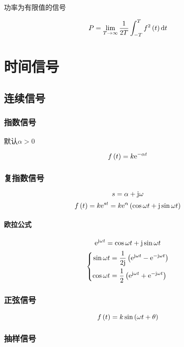 \documentclass{article}
\begin{document}
功率为有限值的信号

\[P=\lim_{T\to\infty}\frac1{2T}\int_{-T}^Tf^2\left(t\right)\mathrm d t\]

\section{时间信号}

\subsection{连续信号}

\subsubsection{指数信号}

默认$\alpha>0$

\[f\left(t\right)=k\mathrm e^{-\alpha t}\]

\subsubsection{复指数信号}

\[s=\alpha+\mathrm j\omega\]
\[f\left(t\right)=k\mathrm e^{st}=k\mathrm e^\alpha\left(\cos\omega t+\mathrm j\sin\omega t\right)\]

\paragraph{欧拉公式}

\[\mathrm e^{\mathrm j\omega t}=\cos\omega t+\mathrm j\sin\omega t\]
\[\left\{\begin{aligned}
        \sin\omega t & =\frac1{2\mathrm j}\left(\mathrm e^{\mathrm j\omega t}-\mathrm e^{-\mathrm j\omega t}\right) \\
        \cos\omega t & =\frac12\left(\mathrm e^{\mathrm j\omega t}+\mathrm e^{-\mathrm j\omega t}\right)     \\
    \end{aligned}\right.\]

\subsubsection{正弦信号}

\[f\left(t\right)=k\sin\left(\omega t+\theta\right)\]

\subsubsection{抽样信号}

\begin{center}
\end{center}
\end{document}
